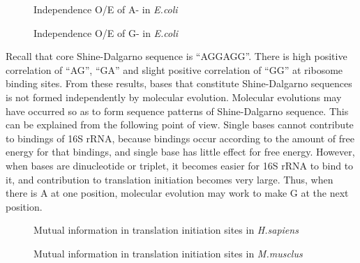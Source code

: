 \begin{figure}
\begin{center}
\end{center}
\caption{Independence O/E of A- in {\it E.coli}}
\label{ecioea-}
\end{figure}

\begin{figure}
\begin{center}
\end{center}
\caption{Independence O/E of G- in {\it E.coli}}
\label{ecioeg-}
\end{figure}

Recall that core Shine-Dalgarno sequence is ``AGGAGG''. There is high
positive correlation of ``AG'', ``GA'' and slight positive correlation
of ``GG'' at ribosome binding sites. From these results, bases that
constitute Shine-Dalgarno sequences is not formed independently by
molecular evolution. Molecular evolutions may have occurred so as to form
sequence patterns of Shine-Dalgarno sequence. This can be explained from
the following point of view. Single bases cannot contribute to bindings
of 16S rRNA, because bindings occur according to the amount of free
energy for that bindings, and single base has little effect for free
energy. However, when bases are dinucleotide or triplet, it becomes
easier for 16S rRNA to bind to it, and contribution to translation
initiation becomes very large. Thus, when there is A at one position,
molecular evolution may work to make G at the next position.

\begin{figure}
\begin{center}
\end{center}
\caption{Mutual information in translation initiation sites in {\it H.sapiens}}
\label{hsapmut1}
\end{figure}

\begin{figure}
\begin{center}
\end{center}
\caption{Mutual information in translation initiation sites in {\it M.musclus}}
\label{mmusmut1}
\end{figure}

